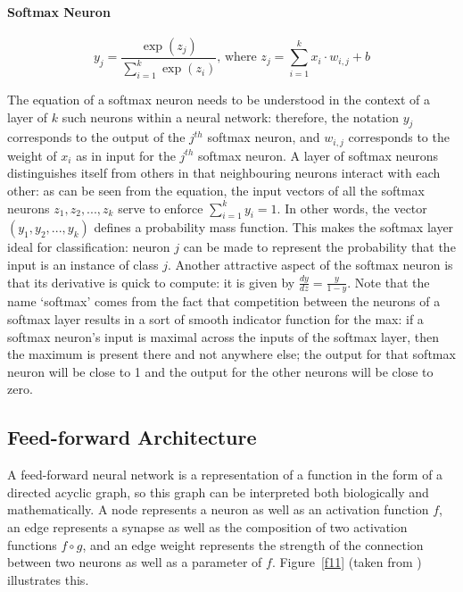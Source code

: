 \documentclass[a4paper,11pt]{article}
\begin{document}
\paragraph{Softmax Neuron}
\begin{equation}
\label{}
y_{j} = \frac{\exp(z_{j})}{\sum\limits_{i=1}^k\exp(z_{i})} \text{, where } z_{j} = \sum\limits_{i=1}^k x_{i}\cdot w_{i,j} + b
\end{equation}

The equation of a softmax neuron needs to be understood in the context of a layer of $k$ such neurons within a neural network: therefore, the notation $y_{j}$ corresponds to the output of the $j^{th}$ softmax neuron, and $w_{i,j}$ corresponds to the weight of $x_{i}$ as in input for the $j^{th}$ softmax neuron. A layer of softmax neurons distinguishes itself from others in that neighbouring neurons interact with each other: as can be seen from the equation, the input vectors of all the softmax neurons $z_{1}, z_{2}, ..., z_{k}$ serve to enforce $\sum\limits_{i=1}^k y_{i} = 1$. In other words, the vector $(y_{1}, y_{2}, ..., y_{k})$ defines a probability mass function. This makes the softmax layer ideal for classification: neuron $j$ can be made to represent the probability that the input is an instance of class $j$. Another attractive aspect of the softmax neuron is that its derivative is quick to compute: it is given by $\frac{dy}{dz} = \frac{y}{1-y}$. Note that the name `softmax' comes from the fact that competition between the neurons of a softmax layer results in a sort of smooth indicator function for the max: if a softmax neuron's input is maximal across the inputs of the softmax layer, then the maximum is present there and not anywhere else; the output for that softmax neuron will be close to 1 and the output for the other neurons will be close to zero.\\


\subsection{Feed-forward Architecture}

A feed-forward neural network is a representation of a function in the form of a directed acyclic graph, so this graph can be interpreted both biologically and mathematically. A node represents a neuron as well as an activation function $f$, an edge represents a synapse as well as the composition of two activation functions $f \circ g$, and an edge weight represents the strength of the connection between two neurons as well as a parameter of $f$. Figure~\ref{f11} (taken from \cite{DL-book}) illustrates this.
\end{document}
